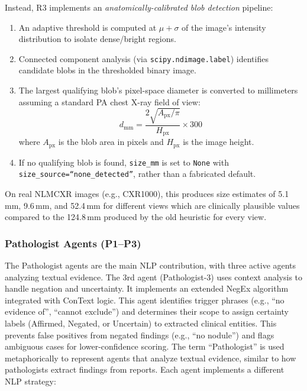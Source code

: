 \documentclass[12pt]{article}
\begin{document}
Instead, R3 implements an \emph{anatomically-calibrated blob detection} pipeline:
\begin{enumerate}
    \item An adaptive threshold is computed at $\mu + \sigma$ of the image's intensity distribution to isolate dense/bright regions.
    \item Connected component analysis (via \texttt{scipy.ndimage.label}) identifies candidate blobs in the thresholded binary image.
    \item The largest qualifying blob's pixel-space diameter is converted to millimeters assuming a standard PA chest X-ray field of view:
    \begin{equation}
        d_\text{mm} = \frac{2\sqrt{A_\text{px} / \pi}}{H_\text{px}} \times 300
    \label{eq:blob-size}
    \end{equation}
    where $A_\text{px}$ is the blob area in pixels and $H_\text{px}$ is the image height.
    \item If no qualifying blob is found, \texttt{size\_mm} is set to \texttt{None} with \texttt{size\_source=``none\_detected''}, rather than a fabricated default.
\end{enumerate}

On real NLMCXR images (e.g., CXR1000), this produces size estimates of 5.1\,mm, 9.6\,mm, and 52.4\,mm for different views which are clinically plausible values compared to the 124.8\,mm produced by the old heuristic for every view.

\subsubsection{Pathologist Agents (P1--P3)}
\label{subsubsec:pathologists}

The Pathologist agents are the main NLP contribution, with three active agents analyzing textual evidence. The 3rd agent (Pathologist-3) uses context analysis to handle negation and uncertainty. It implements an extended NegEx algorithm \cite{chapman2001negex} integrated with ConText \cite{harkema2009context} logic. This agent identifies trigger phrases (e.g., ``no evidence of'', ``cannot exclude'') and determines their scope to assign certainty labels (Affirmed, Negated, or Uncertain) to extracted clinical entities. This prevents false positives from negated findings (e.g., ``no nodule'') and flags ambiguous cases for lower-confidence scoring. The term ``Pathologist'' is used metaphorically to represent agents that analyze textual evidence, similar to how pathologists extract findings from reports. Each agent implements a different NLP strategy:
\end{document}
